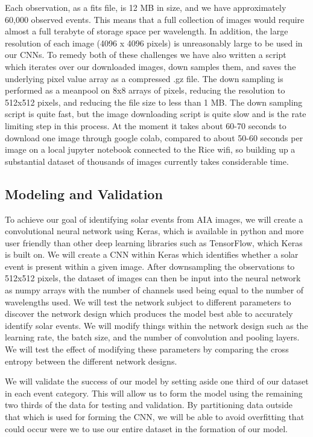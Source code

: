 \documentclass[12pt, letterpaper]{article}
\begin{document}
Each observation, as a fits file, is 12 MB in size, and we have approximately 60,000 observed events. This means that a full collection of images would require almost a full terabyte of storage space per wavelength. In addition, the large resolution of each image (4096 x 4096 pixels) is unreasonably large to be used in our CNNs. To remedy both of these challenges we have also written a script which iterates over our downloaded images, down samples them, and saves the underlying pixel value array as a compressed .gz file. The down sampling is performed as a meanpool on 8x8 arrays of pixels, reducing the resolution to 512x512 pixels, and reducing the file size to less than 1 MB. The down sampling script is quite fast, but the image downloading script is quite slow and is the rate limiting step in this process. At the moment it takes about 60-70 seconds to download one image through google colab, compared to about 50-60 seconds per image on a local jupyter notebook connected to the Rice wifi, so building up a substantial dataset of thousands of images currently takes considerable time.


\subsection*{Modeling and Validation}

To achieve our goal of identifying solar events from AIA images, we will create a convolutional neural network using Keras, which is available in python and more user friendly than other deep learning libraries such as TensorFlow, which Keras is built on. We will create a CNN within Keras which identifies whether a solar event is present within a given image. After downsampling the observations to 512x512 pixels, the dataset of images can then be input into the neural network as numpy arrays with the number of channels used being equal to the number of wavelengths used. We will test the network subject to different parameters to discover the network design which produces the model best able to accurately identify solar events. We will modify things within the network design such as the learning rate, the batch size, and the number of convolution and pooling layers. We will test the effect of modifying these parameters by comparing the cross entropy between the different network designs.

We will validate the success of our model by setting aside one third of our dataset in each event category. This will allow us to form the model using the remaining two thirds of the data for testing and validation. By partitioning data outside that which is used for forming the CNN, we will be able to avoid overfitting that could occur were we to use our entire dataset in the formation of our model. 
\end{document}
